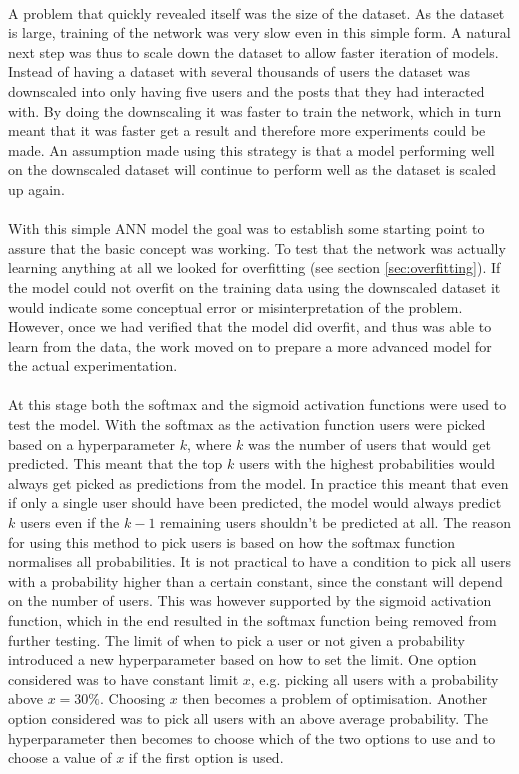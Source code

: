 \\
A problem that quickly revealed itself was the size of the dataset. As the dataset is large, training of the network was very slow even in this simple form. A natural next step was thus to scale down the dataset to allow faster iteration of models. Instead of having a dataset with several thousands of users the dataset was downscaled into only having five users and the posts that they had interacted with. By doing the downscaling it was faster to train the network, which in turn meant that it was faster get a result and therefore more experiments could be made. An assumption made using this strategy is that a model performing well on the downscaled dataset will continue to perform well as the dataset is scaled up again. 
\\\\
With this simple ANN model the goal was to establish some starting point to assure that the basic concept was working. To test that the network was actually learning anything at all we looked for overfitting (see section \ref{sec:overfitting}). If the model could not overfit on the training data using the downscaled dataset it would indicate some conceptual error or misinterpretation of the problem. However, once we had verified that the model did overfit, and thus was able to learn from the data, the work moved on to prepare a more advanced model for the actual experimentation.
\\\\
At this stage both the softmax and the sigmoid activation functions were used to test the model. With the softmax as the activation function users were picked based on a hyperparameter $k$, where $k$ was the number of users that would get predicted. This meant that the top $k$ users with the highest probabilities would always get picked as predictions from the model. In practice this meant that even if only a single user should have been predicted, the model would always predict $k$ users even if the $k-1$ remaining users shouldn't be predicted at all. The reason for using this method to pick users is based on how the softmax function normalises all probabilities. It is not practical to have a condition to pick all users with a probability higher than a certain constant, since the constant will depend on the number of users. This was however supported by the sigmoid activation function, which in the end resulted in the softmax function being removed from further testing. The limit of when to pick a user or not given a probability introduced a new hyperparameter based on how to set the limit. One option considered was to have constant limit $x$, e.g. picking all users with a probability above $x=30\%$. Choosing $x$ then becomes a problem of optimisation. Another option considered was to pick all users with an above average probability. The hyperparameter then becomes to choose which of the two options to use and to choose a value of $x$ if the first option is used.
